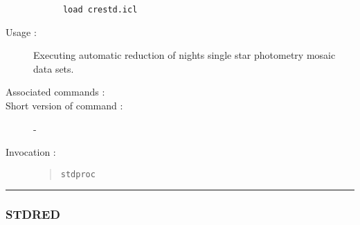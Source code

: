 \begin{description}
\begin{verbatim}
      load crestd.icl
\end{verbatim}

\item[Usage :] Executing automatic reduction of nights single star photometry
mosaic data sets.
\item[Associated commands :] {\tt {}}
\item[Short version of command :] -
\item[Invocation :]

\begin{quote}{\tt  stdproc }\end{quote}

\end{description}

\hrule 
\subsubsection*{\label{STDRED}STDRED}

